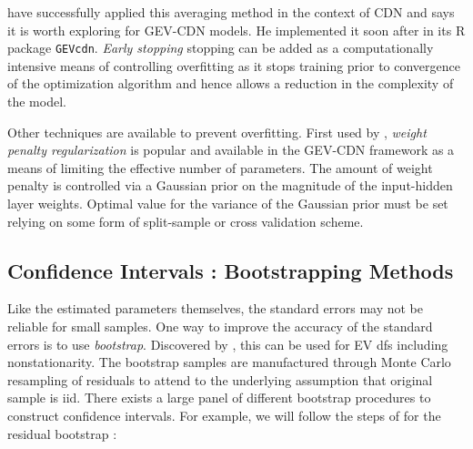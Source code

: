  
\citet{Carney_2005} have successfully applied this averaging method in the context of CDN and \citet{cannon_flexible_2010} says it is worth exploring for GEV-CDN models. He implemented it soon after in its R package \texttt{GEVcdn}. \emph{Early stopping} stopping can be added as a computationally intensive means of controlling overfitting as it stops training prior to convergence of the optimization algorithm and hence allows a reduction in the complexity of the model.

Other techniques are available to prevent overfitting. First used by \citet{mackay92b}, \emph{weight penalty regularization} is popular and available in the GEV-CDN framework as a means of limiting the effective number of parameters. The amount of weight penalty is
controlled via a Gaussian prior on the magnitude of the input-hidden layer weights. Optimal value for the
variance of the Gaussian prior must be set relying on some form of split-sample or cross validation scheme.



\subsection{Confidence Intervals : Bootstrapping Methods}\label{sec:nnboot}

Like the estimated parameters themselves, the standard errors may not be reliable for small samples. One way to improve the accuracy of the standard errors is to use \emph{bootstrap}. Discovered by \citet{efron1979}, this can be used for EV dfs including nonstationarity. The bootstrap samples are manufactured through
Monte Carlo resampling of residuals to attend to the underlying assumption  that original sample is iid.
There exists a large panel of different bootstrap procedures to construct confidence intervals.  For example, we will follow the steps of \citet{2006JHyd..329..534K} for the residual bootstrap : 
 
